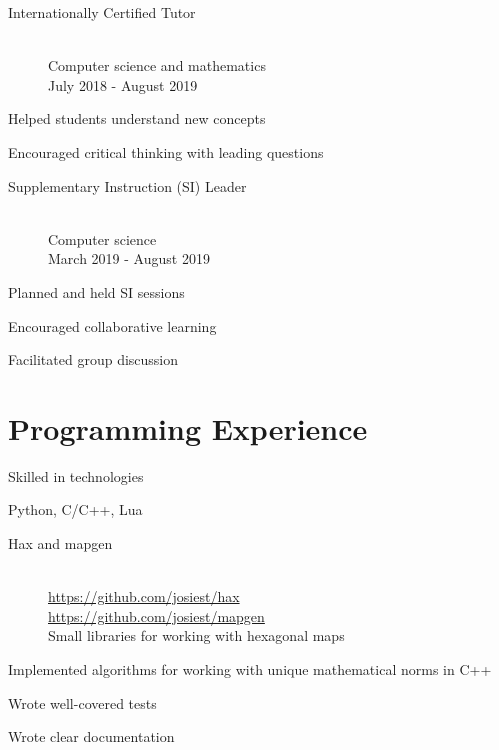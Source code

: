 \documentclass[10pt]{article}
\newenvironment{itemize*}
{\begin{itemize}[leftmargin=*]
    \setlength{\itemsep}{0pt}
    \setlength{\parskip}{0pt}}
{\end{itemize}}
\begin{document}
\begin{paracol}{2}
\begin{description}
\item[Internationally Certified Tutor]~\\
    Computer science and mathematics\\
    July 2018 - August 2019
\end{description}
\begin{itemize*}
\item Helped students understand new concepts
\item Encouraged critical thinking with leading questions
\end{itemize*}

\begin{description}
\item[Supplementary Instruction (SI) Leader]~\\
    Computer science\\
    March 2019 - August 2019
\end{description}
\begin{itemize*}
\item Planned and held SI sessions
\item Encouraged collaborative learning
\item Facilitated group discussion
\end{itemize*}

\switchcolumn
\section*{Programming Experience}
\begin{description}
\item[Skilled in technologies]
\end{description}
\begin{itemize*}
\item Python, C/C++, Lua
\end{itemize*}

\begin{description}
\item[Hax and mapgen]~\\
    \url{https://github.com/josiest/hax}\\
    \url{https://github.com/josiest/mapgen}\\
    Small libraries for working with hexagonal maps
\end{description}
\begin{itemize*}
\item Implemented algorithms for working with unique mathematical norms in C++
\item Wrote well-covered tests
\item Wrote clear documentation
\end{itemize*}


\end{paracol}
\end{document}
